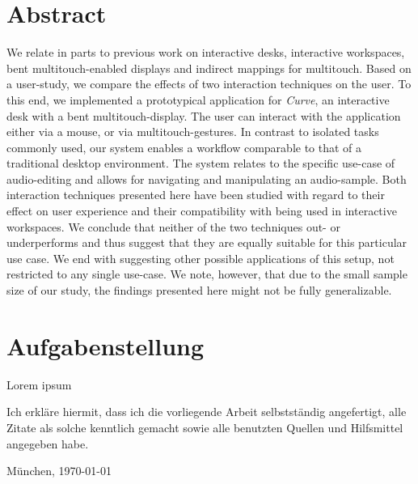 \section*{Abstract}

We relate in parts to previous work on interactive desks, interactive workspaces, bent multitouch-enabled displays
and indirect mappings for multitouch. Based on a user-study, we compare the effects of two interaction techniques on the user.
To this end, we implemented a prototypical application for \emph{Curve}, an interactive desk with a bent multitouch-display.
The user can interact with the application either via a mouse, or via multitouch-gestures.
In contrast to isolated tasks commonly used, our system enables a workflow comparable to that of a traditional desktop
environment. The system relates to the specific use-case of audio-editing and allows for navigating and manipulating an audio-sample.
Both interaction techniques presented here have been studied with regard to their effect on user experience and their
compatibility with being used in interactive workspaces. We conclude that neither of the two techniques out- or underperforms
and thus suggest that they are equally suitable for this particular use case. We end with suggesting other possible applications
of this setup, not restricted to any single use-case. We note, however, that due to the small sample size of our study, the
findings presented here might not be fully generalizable.

\clearpage
\section*{Aufgabenstellung}

Lorem ipsum

\vfill %


\noindent Ich erkläre hiermit, dass ich die vorliegende Arbeit
selbstständig angefertigt, alle Zitate als solche kenntlich gemacht
sowie alle benutzten Quellen und Hilfsmittel angegeben habe.

\bigskip\noindent München, \today

\vspace{4ex}\noindent\makebox[7cm]{\dotfill}


\cleardoublepage
\pagestyle{fancy}
\setcounter{page}{1}



\cleardoublepage

\setcounter{page}{1}
\fancyhead[LE,RO]{\rightmark}
\fancyhead[LO,RE]{\leftmark}
\fancyfoot[LE,RO]{\thepage}